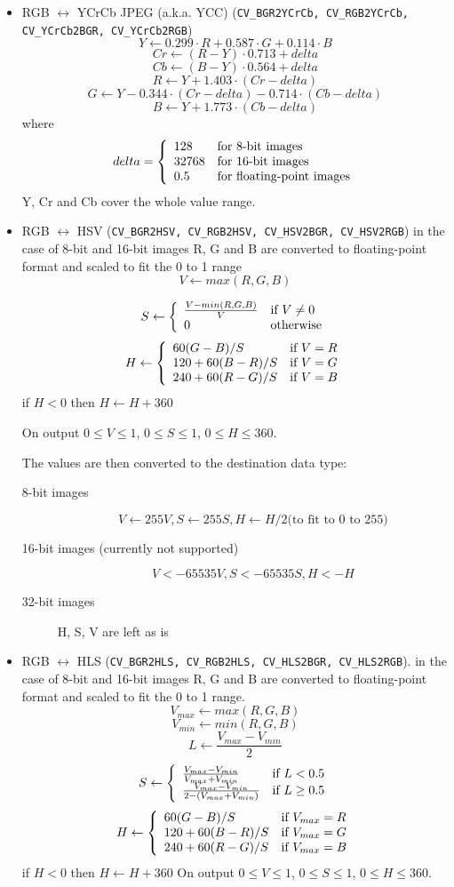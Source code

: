 \begin{itemize}
 \item RGB $\leftrightarrow$ YCrCb JPEG (a.k.a. YCC) (\texttt{CV\_BGR2YCrCb, CV\_RGB2YCrCb, CV\_YCrCb2BGR, CV\_YCrCb2RGB})
 \[ Y \leftarrow 0.299 \cdot R + 0.587 \cdot G + 0.114 \cdot B \]
 \[  Cr \leftarrow (R-Y) \cdot 0.713 + delta \]
 \[  Cb \leftarrow (B-Y) \cdot 0.564 + delta \]
 \[  R \leftarrow Y + 1.403 \cdot (Cr - delta) \]
 \[  G \leftarrow Y - 0.344 \cdot (Cr - delta) - 0.714 \cdot (Cb - delta) \]
 \[  B \leftarrow Y + 1.773 \cdot (Cb - delta) \]
where
 \[
  delta = \left\{
  \begin{array}{l l}
  128 & \mbox{for 8-bit images}\\
  32768 & \mbox{for 16-bit images}\\
  0.5 & \mbox{for floating-point images}
  \end{array} \right.
 \]
Y, Cr and Cb cover the whole value range.

 \item RGB $\leftrightarrow$ HSV (\texttt{CV\_BGR2HSV, CV\_RGB2HSV, CV\_HSV2BGR, CV\_HSV2RGB})
  in the case of 8-bit and 16-bit images
  R, G and B are converted to floating-point format and scaled to fit the 0 to 1 range
  \[ V \leftarrow max(R,G,B) \]

\[ S \leftarrow \left\{ \begin{array}{l l} \frac{V-min(R,G,B)}{V} & \mbox{if $V \neq 0$}\\ 0 & \mbox{otherwise}\\ \end{array} \right. \]
\[ H \leftarrow \left\{ \begin{array}{l l} {60(G - B)}/{S} & \mbox{if $V=R$}\\ {120+60(B - R)}/{S} & \mbox{if $V=G$}\\ {240+60(R - G)}/{S} & \mbox{if $V=B$}\\ \end{array} \right. \]
if $H<0$ then $H \leftarrow H+360$

On output $0 \leq V \leq 1$, $0 \leq S \leq 1$, $0 \leq H \leq 360$.

The values are then converted to the destination data type:
\begin{description}
\item[8-bit images]
\[ V \leftarrow 255 V, S \leftarrow 255 S, H \leftarrow H/2 \text{(to fit to 0 to 255)} \]
\item[16-bit images (currently not supported)]
\[ V <- 65535 V, S <- 65535 S, H <- H \]
\item[32-bit images]
H, S, V are left as is
\end{description}

 \item RGB $\leftrightarrow$ HLS (\texttt{CV\_BGR2HLS, CV\_RGB2HLS, CV\_HLS2BGR, CV\_HLS2RGB}).
  in the case of 8-bit and 16-bit images
  R, G and B are converted to floating-point format and scaled to fit the 0 to 1 range.
  \[ V_{max} \leftarrow {max}(R,G,B) \]
  \[ V_{min} \leftarrow {min}(R,G,B) \]
  \[ L \leftarrow \frac{V_{max} - V_{min}}{2} \]
  \[ S \leftarrow \left\{ \begin{array}{l l} \frac{V_{max} - V_{min}}{V_{max} + V_{min}} & \mbox{if $L < 0.5$}\\ \frac{V_{max} - V_{min}}{2 - (V_{max} + V_{min})} & \mbox{if $L \ge 0.5$}\\ \end{array} \right. \]
  \[ H \leftarrow \left\{ \begin{array}{l l} {60(G - B)}/{S} & \mbox{if $V_{max}=R$}\\ {120+60(B - R)}/{S} & \mbox{if $V_{max}=G$}\\ {240+60(R - G)}/{S} & \mbox{if $V_{max}=B$}\\ \end{array} \right. \]
  if $H<0$ then $H \leftarrow H+360$
On output $0 \leq V \leq 1$, $0 \leq S \leq 1$, $0 \leq H \leq 360$.


\end{itemize}
